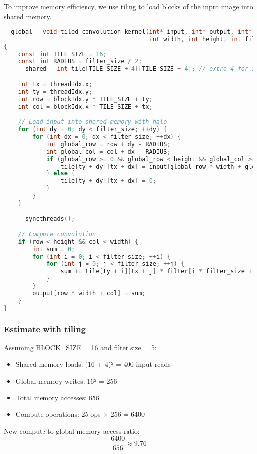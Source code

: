 \documentclass[11pt]{article}
\begin{document}
To improve memory efficiency, we use tiling to load blocks of the input image into shared memory.

\begin{lstlisting}[language=C,numbers=none]
__global__ void tiled_convolution_kernel(int* input, int* output, int* filter,
                                         int width, int height, int filter_size)
{
    const int TILE_SIZE = 16;
    const int RADIUS = filter_size / 2;
    __shared__ int tile[TILE_SIZE + 4][TILE_SIZE + 4]; // extra 4 for 5x5 filter padding

    int tx = threadIdx.x;
    int ty = threadIdx.y;
    int row = blockIdx.y * TILE_SIZE + ty;
    int col = blockIdx.x * TILE_SIZE + tx;

    // Load input into shared memory with halo
    for (int dy = 0; dy < filter_size; ++dy) {
        for (int dx = 0; dx < filter_size; ++dx) {
            int global_row = row + dy - RADIUS;
            int global_col = col + dx - RADIUS;
            if (global_row >= 0 && global_row < height && global_col >= 0 && global_col < width) {
                tile[ty + dy][tx + dx] = input[global_row * width + global_col];
            } else {
                tile[ty + dy][tx + dx] = 0;
            }
        }
    }

    __syncthreads();

    // Compute convolution
    if (row < height && col < width) {
        int sum = 0;
        for (int i = 0; i < filter_size; ++i) {
            for (int j = 0; j < filter_size; ++j) {
                sum += tile[ty + i][tx + j] * filter[i * filter_size + j];
            }
        }
        output[row * width + col] = sum;
    }
}
\end{lstlisting}
\subsubsection{Estimate with tiling}
\label{sec:org8c7caba}

Assuming BLOCK\_SIZE = 16 and filter size = 5:
\begin{itemize}
\item Shared memory loads: (16 + 4)² = 400 input reads
\item Global memory writes: 16² = 256
\item Total memory accesses: 656
\item Compute operations: 25 ops × 256 = 6400
\end{itemize}

New compute-to-global-memory-access ratio:
\[
\frac{6400}{656} \approx 9.76
\]
\end{document}
